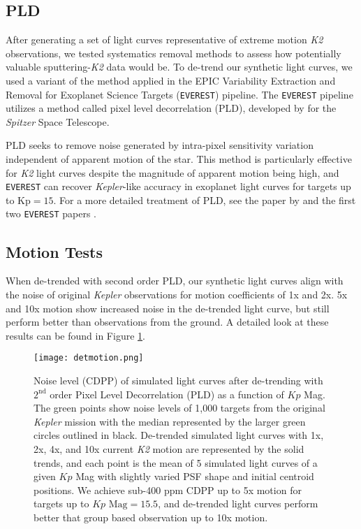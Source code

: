 \documentclass[12pt,preprint]{aastex}
\begin{document}
\subsection{PLD}

After generating a set of light curves representative of extreme motion \textit{K2} observations, we tested systematics removal methods to assess how potentially valuable sputtering-\textit{K2} data would be. To de-trend our synthetic light curves, we used a variant of the method applied in the EPIC Variability Extraction and Removal for Exoplanet Science Targets (\texttt{EVEREST}) pipeline. The \texttt{EVEREST} pipeline utilizes a method called pixel level decorrelation (PLD), developed by \cite{0004-637X-805-2-132} for the \textit{Spitzer} Space Telescope.

PLD seeks to remove noise generated by intra-pixel sensitivity variation independent of apparent motion of the star. This method is particularly effective for \textit{K2} light curves despite the magnitude of apparent motion being high, and \texttt{EVEREST} can recover \textit{Kepler}-like accuracy in exoplanet light curves for targets up to $\text{Kp} = 15$. For a more detailed treatment of PLD, see the paper by \cite{0004-637X-805-2-132} and the first two \texttt{EVEREST} papers \citep{2016AJ....152..100L,2017arXiv170205488L}.

\subsection{Motion Tests}

When de-trended with second order PLD, our synthetic light curves align with the noise of original \textit{Kepler} observations for motion coefficients of 1x and 2x. 5x and 10x motion show increased noise in the de-trended light curve, but still perform better than observations from the ground. A detailed look at these results can be found in Figure \ref{fig:detmotion}.

\begin{figure}[h]
	\centering
	\texttt{[image: detmotion.png]}
	\caption{Noise level (CDPP) of simulated light curves after de-trending with $2^{\text{nd}}$ order Pixel Level Decorrelation (PLD) as a function of $Kp$ Mag. The green points show noise levels of 1,000 targets from the original \textit{Kepler} mission with the median represented by the larger green circles outlined in black. De-trended simulated light curves with 1x, 2x, 4x, and 10x current \textit{K2} motion are represented by the solid trends, and each point is the mean of 5 simulated light curves of a given $Kp$ Mag with slightly varied PSF shape and initial centroid positions. We achieve sub-400 ppm CDPP up to 5x motion for targets up to $Kp \text{ Mag}=15.5$, and de-trended light curves perform better that group based observation up to 10x motion.}
	\label{fig:detmotion}
\end{figure}
\end{document}
